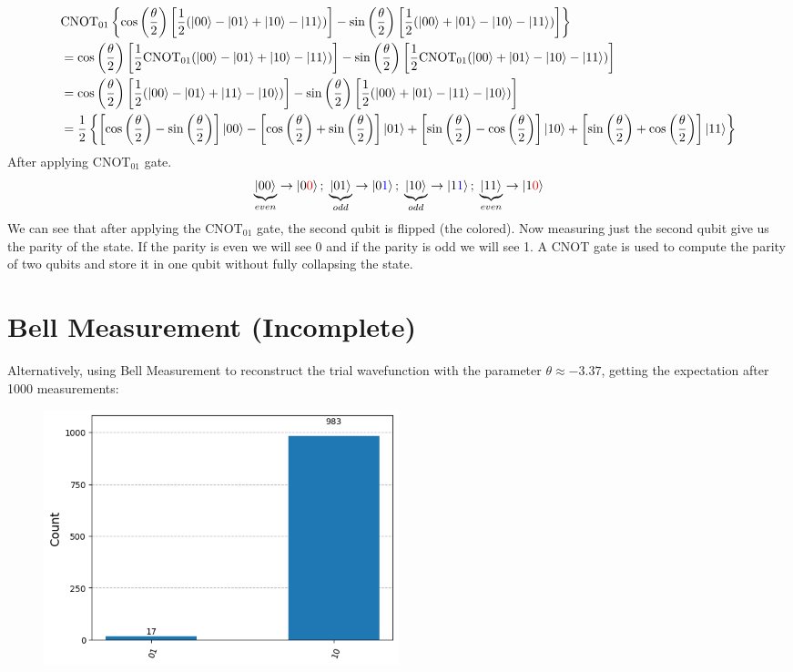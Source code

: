 \documentclass{article}
\begin{document}
\begin{align*}
	 & \text{CNOT}_{01} \left\{\cos\left(\frac{\theta}{2}\right)\left[\frac{1}{2}(|00\rangle - |01\rangle + |10\rangle - |11\rangle)\right] - \sin\left(\frac{\theta}{2}\right)\left[\frac{1}{2}(|00\rangle + |01\rangle - |10\rangle - |11\rangle)\right]\right\}                                                \\
	 & = \cos\left(\frac{\theta}{2}\right)\left[\frac{1}{2}\text{CNOT}_{01}(|00\rangle - |01\rangle + |10\rangle - |11\rangle)\right] - \sin\left(\frac{\theta}{2}\right)\left[\frac{1}{2}\text{CNOT}_{01}(|00\rangle + |01\rangle - |10\rangle - |11\rangle)\right]                                              \\
	 & = \cos\left(\frac{\theta}{2}\right)\left[\frac{1}{2}(|00\rangle - |01\rangle + |11\rangle - |10\rangle)\right] - \sin\left(\frac{\theta}{2}\right)\left[\frac{1}{2}(|00\rangle + |01\rangle - |11\rangle - |10\rangle)\right]                                                                              \\
	 & = \frac{1}{2}\left\{\left[\cos\left(\frac{\theta}{2}\right) - \sin\left(\frac{\theta}{2}\right)\right]\ket{00} - \left[\cos\left(\frac{\theta}{2}\right) + \sin\left(\frac{\theta}{2}\right)\right] \ket{01} + \left[\sin\left(\frac{\theta}{2}\right) - \cos\left(\frac{\theta}{2}\right)\right] \ket{10}
	+ \left[\sin\left(\frac{\theta}{2}\right)+ \cos\left(\frac{\theta}{2}\right) \right]\ket{11} \right\}
\end{align*}
After applying \(\text{CNOT}_{01}\) gate.
\[\underbrace{\ket{00}}_{even} \rightarrow \ket{0\textcolor{red}{0}}; \; \underbrace{\ket{01}}_{odd} \rightarrow \ket{0\textcolor{blue}{1}}; \; \underbrace{\ket{10}}_{odd} \rightarrow \ket{1 \textcolor{blue}{1}}; \; \underbrace{\ket{11}}_{even} \rightarrow \ket{1\textcolor{red}{0}}\]
We can see that after applying the \(\text{CNOT}_{01}\) gate, the second qubit is flipped (the colored). Now measuring just the second qubit give us the parity of the state. If the parity is even we will see 0 and if the parity is odd we will see 1. A CNOT gate is used to compute the parity
of two qubits and store it in one qubit without fully collapsing the state. \\
\section{Bell Measurement (Incomplete)}
Alternatively, using Bell Measurement to reconstruct the trial wavefunction with the parameter \(\theta \approx -3.37\), getting the expectation after 1000 measurements:
\begin{figure}[H]
	\centering
	\includegraphics[width=0.5\textwidth, height=0.3\textheight]{1000.png}
\end{figure}
\end{document}
